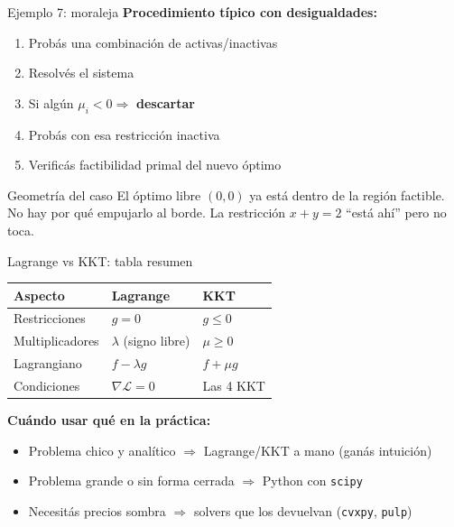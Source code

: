 \documentclass{beamer}
\begin{document}
\begin{frame}{Ejemplo 7: moraleja}
    \small
    \textbf{Procedimiento típico con desigualdades:}

    \vspace{0.3em}

    \begin{enumerate}
        \item Probás una combinación de activas/inactivas
        \item Resolvés el sistema
        \item Si algún $\mu_i < 0 \Rightarrow$ \textbf{descartar}
        \item Probás con esa restricción inactiva
        \item Verificás factibilidad primal del nuevo óptimo
    \end{enumerate}

    \vspace{0.5em}

    \begin{alertblock}{Geometría del caso}
        El óptimo libre $(0,0)$ ya está dentro de la región factible. No hay por qué empujarlo al borde. La restricción $x + y = 2$ ``está ahí'' pero no toca.
    \end{alertblock}
\end{frame}

\begin{frame}{Lagrange vs KKT: tabla resumen}
    \small
    \begin{center}
    \begin{tabular}{lll}
    \toprule
    \textbf{Aspecto} & \textbf{Lagrange} & \textbf{KKT} \\
    \midrule
    Restricciones & $g = 0$ & $g \leq 0$ \\
    Multiplicadores & $\lambda$ (signo libre) & $\mu \geq 0$ \\
    Lagrangiano & $f - \lambda g$ & $f + \mu g$ \\
    Condiciones & $\nabla \mathcal{L} = 0$ & Las 4 KKT \\
    \bottomrule
    \end{tabular}
    \end{center}

    \vspace{0.8em}

    \textbf{Cuándo usar qué en la práctica:}
    \begin{itemize}
        \item Problema chico y analítico $\Rightarrow$ Lagrange/KKT a mano (ganás intuición)
        \item Problema grande o sin forma cerrada $\Rightarrow$ Python con \texttt{scipy}
        \item Necesitás precios sombra $\Rightarrow$ solvers que los devuelvan (\texttt{cvxpy}, \texttt{pulp})
    \end{itemize}
\end{frame}
\end{document}
